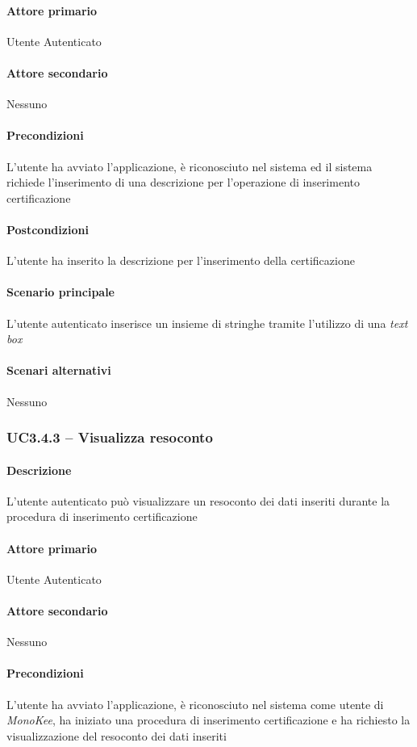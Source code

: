 \paragraph{Attore primario}  Utente Autenticato
\paragraph{Attore secondario}  Nessuno
\paragraph{Precondizioni} L’utente ha avviato l’applicazione, è riconosciuto nel sistema ed il sistema richiede l’inserimento di una descrizione per l’operazione di inserimento certificazione
\paragraph{Postcondizioni}  L’utente ha inserito la descrizione per l’inserimento della certificazione
\paragraph{Scenario principale}  
L’utente autenticato inserisce un insieme di stringhe tramite l’utilizzo di una \textit{text box}
\paragraph{Scenari alternativi}  Nessuno




\subsubsection{UC3.4.3 – Visualizza resoconto}
\paragraph{Descrizione}  L’utente autenticato può visualizzare un resoconto dei dati inseriti durante la procedura di inserimento certificazione
\paragraph{Attore primario}  Utente Autenticato
\paragraph{Attore secondario}  Nessuno
\paragraph{Precondizioni} L’utente ha avviato l’applicazione, è riconosciuto nel sistema come utente di \textit{MonoKee}, ha iniziato una procedura di inserimento certificazione e ha richiesto la visualizzazione del resoconto dei dati inseriti
